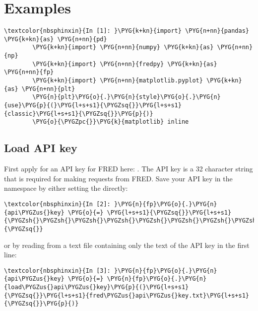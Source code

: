 \documentclass[letterpaper,10pt,openany,oneside,english]{sphinxmanual}
\begin{document}
\section{ Examples}
\label{\detokenize{fredpy_examples:fredpy-Examples}}\label{\detokenize{fredpy_examples::doc}}
%
\begin{Verbatim}[commandchars=\\\{\}]
\textcolor{nbsphinxin}{In [1]: }\PYG{k+kn}{import} \PYG{n+nn}{pandas} \PYG{k+kn}{as} \PYG{n+nn}{pd}
        \PYG{k+kn}{import} \PYG{n+nn}{numpy} \PYG{k+kn}{as} \PYG{n+nn}{np}
        \PYG{k+kn}{import} \PYG{n+nn}{fredpy} \PYG{k+kn}{as} \PYG{n+nn}{fp}
        \PYG{k+kn}{import} \PYG{n+nn}{matplotlib.pyplot} \PYG{k+kn}{as} \PYG{n+nn}{plt}
        \PYG{n}{plt}\PYG{o}{.}\PYG{n}{style}\PYG{o}{.}\PYG{n}{use}\PYG{p}{(}\PYG{l+s+s1}{\PYGZsq{}}\PYG{l+s+s1}{classic}\PYG{l+s+s1}{\PYGZsq{}}\PYG{p}{)}
        \PYG{o}{\PYGZpc{}}\PYG{k}{matplotlib} inline
\end{Verbatim}


\subsection{Load API key}
\label{\detokenize{fredpy_examples:Load-API-key}}
First apply for an API key for FRED here:
. The API key is a
32 character string that is required for making requests from FRED. Save
your API key in the  namespace by either setting the
 directly:

%
\begin{Verbatim}[commandchars=\\\{\}]
\textcolor{nbsphinxin}{In [2]: }\PYG{n}{fp}\PYG{o}{.}\PYG{n}{api\PYGZus{}key} \PYG{o}{=} \PYG{l+s+s1}{\PYGZsq{}}\PYG{l+s+s1}{\PYGZsh{}\PYGZsh{}\PYGZsh{}\PYGZsh{}\PYGZsh{}\PYGZsh{}\PYGZsh{}\PYGZsh{}\PYGZsh{}\PYGZsh{}\PYGZsh{}\PYGZsh{}\PYGZsh{}\PYGZsh{}\PYGZsh{}\PYGZsh{}\PYGZsh{}\PYGZsh{}\PYGZsh{}\PYGZsh{}\PYGZsh{}\PYGZsh{}\PYGZsh{}\PYGZsh{}\PYGZsh{}\PYGZsh{}\PYGZsh{}\PYGZsh{}\PYGZsh{}\PYGZsh{}\PYGZsh{}\PYGZsh{}}\PYG{l+s+s1}{\PYGZsq{}}
\end{Verbatim}

or by reading from a text file containing only the text of the API key
in the first line:

%
\begin{Verbatim}[commandchars=\\\{\}]
\textcolor{nbsphinxin}{In [3]: }\PYG{n}{fp}\PYG{o}{.}\PYG{n}{api\PYGZus{}key} \PYG{o}{=} \PYG{n}{fp}\PYG{o}{.}\PYG{n}{load\PYGZus{}api\PYGZus{}key}\PYG{p}{(}\PYG{l+s+s1}{\PYGZsq{}}\PYG{l+s+s1}{fred\PYGZus{}api\PYGZus{}key.txt}\PYG{l+s+s1}{\PYGZsq{}}\PYG{p}{)}
\end{Verbatim}
\end{document}
